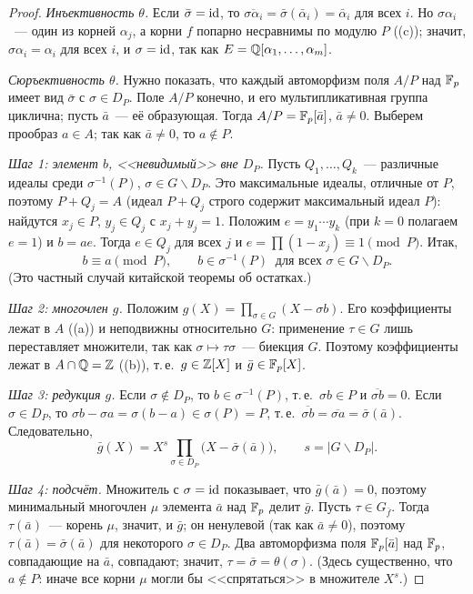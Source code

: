 \begin{proof}
\emph{Инъективность $\theta$.} Если $\bar\sigma=\operatorname{id}$, то $\overline{\sigma\alpha_i}=\bar\sigma(\bar\alpha_i)=\bar\alpha_i$ для
всех $i$. Но $\sigma\alpha_i$~--- один из корней $\alpha_j$, а корни $f$ попарно несравнимы по модулю $P$ ((c)); значит,
$\sigma\alpha_i=\alpha_i$ для всех $i$, и $\sigma=\operatorname{id}$, так как $E=\mathbb Q[\alpha_1,\dots,\alpha_m]$.

\emph{Сюръективность $\theta$.} Нужно показать, что каждый автоморфизм поля $A/P$ над $\mathbb F_p$ имеет вид $\bar\sigma$ с
$\sigma\in D_P$. Поле $A/P$ конечно, и его мультипликативная группа циклична; пусть $\bar a$~--- её образующая. Тогда
$A/P=\mathbb F_p[\bar a]$, $\bar a\ne0$. Выберем прообраз $a\in A$; так как $\bar a\ne0$, то $a\notin P$.

\emph{Шаг 1: элемент $b$, <<невидимый>> вне $D_P$.} Пусть $Q_1,\dots,Q_k$~--- различные идеалы среди $\sigma^{-1}(P)$,
$\sigma\in G\smallsetminus D_P$. Это максимальные идеалы, отличные от $P$, поэтому $P+Q_j=A$ (идеал $P+Q_j$ строго содержит
максимальный идеал $P$): найдутся $x_j\in P$, $y_j\in Q_j$ с $x_j+y_j=1$. Положим $e=y_1\cdots y_k$ (при $k=0$ полагаем $e=1$) и
$b=ae$. Тогда $e\in Q_j$ для всех $j$ и $e=\prod(1-x_j)\equiv1\pmod P$. Итак,
\[
b\equiv a\pmod P,\qquad b\in\sigma^{-1}(P)\ \text{ для всех }\sigma\in G\smallsetminus D_P .
\]
(Это частный случай китайской теоремы об остатках.)

\emph{Шаг 2: многочлен $g$.} Положим $g(X)=\prod_{\sigma\in G}(X-\sigma b)$. Его коэффициенты лежат в $A$ ((a)) и
неподвижны относительно $G$: применение $\tau\in G$ лишь переставляет множители, так как $\sigma\mapsto\tau\sigma$~---
биекция $G$. Поэтому коэффициенты лежат в $A\cap\mathbb Q=\mathbb Z$ ((b)), т.\,е.\ $g\in\mathbb Z[X]$ и $\bar g\in\mathbb F_p[X]$.

\emph{Шаг 3: редукция $g$.} Если $\sigma\notin D_P$, то $b\in\sigma^{-1}(P)$, т.\,е.\ $\sigma b\in P$ и
$\overline{\sigma b}=0$. Если $\sigma\in D_P$, то $\sigma b-\sigma a=\sigma(b-a)\in\sigma(P)=P$, т.\,е.\
$\overline{\sigma b}=\overline{\sigma a}=\bar\sigma(\bar a)$. Следовательно,
\[
\bar g(X)=X^{s}\prod_{\sigma\in D_P}\bigl(X-\bar\sigma(\bar a)\bigr),\qquad s=|G\smallsetminus D_P| .
\]

\emph{Шаг 4: подсчёт.} Множитель с $\sigma=\operatorname{id}$ показывает, что $\bar g(\bar a)=0$, поэтому минимальный многочлен $\mu$
элемента $\bar a$ над $\mathbb F_p$ делит $\bar g$. Пусть $\tau\in G_{\bar f}$. Тогда $\tau(\bar a)$~--- корень $\mu$, значит, и
$\bar g$; он ненулевой (так как $\bar a\ne0$), поэтому $\tau(\bar a)=\bar\sigma(\bar a)$ для некоторого $\sigma\in D_P$. Два
автоморфизма поля $\mathbb F_p[\bar a]$ над $\mathbb F_p$, совпадающие на $\bar a$, совпадают; значит, $\tau=\bar\sigma=\theta(\sigma)$.
(Здесь существенно, что $a\notin P$: иначе все корни $\mu$ могли бы <<спрятаться>> в множителе $X^s$.)


\end{proof}
